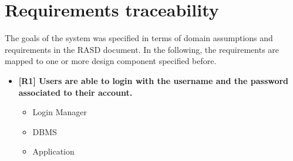 \chapter{Requirements traceability}

The goals of the system was specified in terms of domain assumptions and requirements in the RASD document.
In the following, the requirements are mapped to one or more design component specified before.

\begin{itemize}
\item \textbf{[R1] Users are able to login with the username and the password associated to
their account. }  
\begin{itemize}
\item Login Manager
\item DBMS
\item Application
\end{itemize}
\end{itemize}




